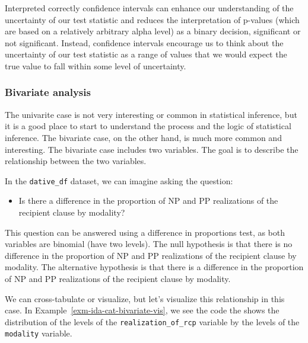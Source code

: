 \documentclass[
  letterpaper,
  DIV=11,
  numbers=noendperiod]{scrreprt}
\providecommand{\tightlist}{%
  \setlength{\itemsep}{0pt}\setlength{\parskip}{0pt}}\usepackage{longtable,booktabs,array}
\theoremstyle{definition}
\theoremstyle{remark}
\begin{document}
Interpreted correctly confidence intervals can enhance our understanding
of the uncertainty of our test statistic and reduces the interpretation
of p-values (which are based on a relatively arbitrary alpha level) as a
binary decision, significant or not significant. Instead, confidence
intervals encourage us to think about the uncertainty of our test
statistic as a range of values that we would expect the true value to
fall within some level of uncertainty.

\subsubsection{Bivariate analysis}\label{sec-ida-cat-bivariate}

The univarite case is not very interesting or common in statistical
inference, but it is a good place to start to understand the process and
the logic of statistical inference. The bivariate case, on the other
hand, is much more common and interesting. The bivariate case includes
two variables. The goal is to describe the relationship between the two
variables.

In the \texttt{dative\_df} dataset, we can imagine asking the question:

\begin{itemize}
\tightlist
\item
  Is there a difference in the proportion of NP and PP realizations of
  the recipient clause by modality?
\end{itemize}

This question can be answered using a difference in proportions test, as
both variables are binomial (have two levels). The null hypothesis is
that there is no difference in the proportion of NP and PP realizations
of the recipient clause by modality. The alternative hypothesis is that
there is a difference in the proportion of NP and PP realizations of the
recipient clause by modality.

We can cross-tabulate or visualize, but let's visualize this
relationship in this case. In Example~\ref{exm-ida-cat-bivariate-vis},
we see the code the shows the distribution of the levels of the
\texttt{realization\_of\_rcp} variable by the levels of the
\texttt{modality} variable.
\end{document}
